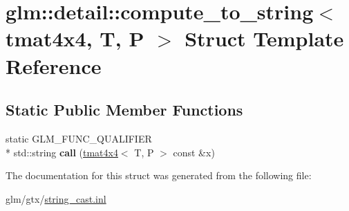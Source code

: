 \hypertarget{structglm_1_1detail_1_1compute__to__string_3_01tmat4x4_00_01T_00_01P_01_4}{\section{glm\-:\-:detail\-:\-:compute\-\_\-to\-\_\-string$<$ tmat4x4, T, P $>$ Struct Template Reference}
\label{structglm_1_1detail_1_1compute__to__string_3_01tmat4x4_00_01T_00_01P_01_4}
}
\subsection*{Static Public Member Functions}
\begin{DoxyCompactItemize}
\item 
\hypertarget{structglm_1_1detail_1_1compute__to__string_3_01tmat4x4_00_01T_00_01P_01_4_ac6e1968f8240ac2d9644216a7922bab2}{static G\-L\-M\-\_\-\-F\-U\-N\-C\-\_\-\-Q\-U\-A\-L\-I\-F\-I\-E\-R \\*
std\-::string {\bfseries call} (\hyperlink{structglm_1_1tmat4x4}{tmat4x4}$<$ T, P $>$ const \&x)}\label{structglm_1_1detail_1_1compute__to__string_3_01tmat4x4_00_01T_00_01P_01_4_ac6e1968f8240ac2d9644216a7922bab2}

\end{DoxyCompactItemize}


The documentation for this struct was generated from the following file\-:\begin{DoxyCompactItemize}
\item 
glm/gtx/\hyperlink{string__cast_8inl}{string\-\_\-cast.\-inl}\end{DoxyCompactItemize}
